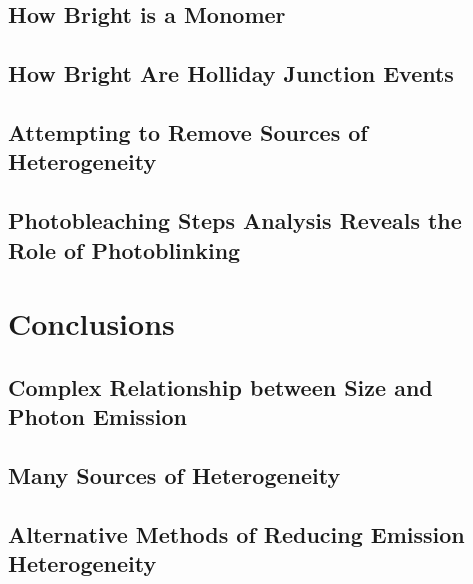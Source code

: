 \subsection{How Bright is a Monomer}
\subsection{How Bright Are Holliday Junction Events}
\subsection{Attempting to Remove Sources of Heterogeneity}
\subsection{Photobleaching Steps Analysis Reveals the Role of Photoblinking}

\section{Conclusions}
\subsection{Complex Relationship between Size and Photon Emission}
\subsection{Many Sources of Heterogeneity}
\subsection{Alternative Methods of Reducing Emission Heterogeneity}